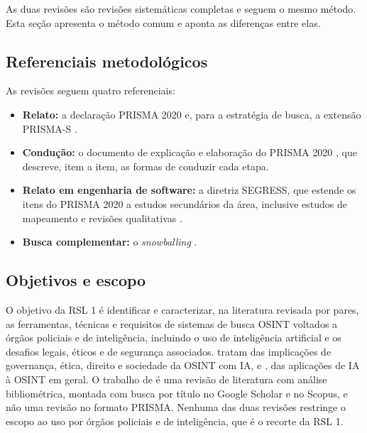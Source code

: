 As duas revisões são revisões sistemáticas completas e seguem o mesmo método.
Esta seção apresenta o método comum e aponta as diferenças entre elas.

\subsection{Referenciais metodológicos}

As revisões seguem quatro referenciais:

\begin{itemize}
	\item \textbf{Relato:} a declaração PRISMA 2020 \cite{page2021prisma} e,
	para a estratégia de busca, a extensão PRISMA-S \cite{rethlefsen2021}.
	\item \textbf{Condução:} o documento de explicação e elaboração do PRISMA
	2020 \cite{page2021ee}, que descreve, item a item, as formas de conduzir
	cada etapa.
	\item \textbf{Relato em engenharia de software:} a diretriz SEGRESS,
	que estende os itens do PRISMA 2020 a estudos secundários da área,
	inclusive estudos de mapeamento e revisões qualitativas
	\cite{kitchenham2023segress}.
	\item \textbf{Busca complementar:} o \textit{snowballing}
	\cite{wohlin2014}.
\end{itemize}

\subsection{Objetivos e escopo}

O objetivo da RSL 1 é identificar e caracterizar, na literatura revisada por
pares, as ferramentas, técnicas e requisitos de sistemas de busca OSINT
voltados a órgãos policiais e de inteligência, incluindo o uso de inteligência
artificial e os desafios legais, éticos e de segurança associados.
 tratam das implicações de governança, ética, direito e
sociedade da OSINT com IA, e , das aplicações de IA à
OSINT em geral. O trabalho de  é uma revisão de
literatura com análise bibliométrica, montada com busca por título no Google
Scholar e no Scopus, e não uma revisão no formato PRISMA. Nenhuma das duas
revisões restringe o escopo ao uso por órgãos policiais e de inteligência, que
é o recorte da RSL 1.


